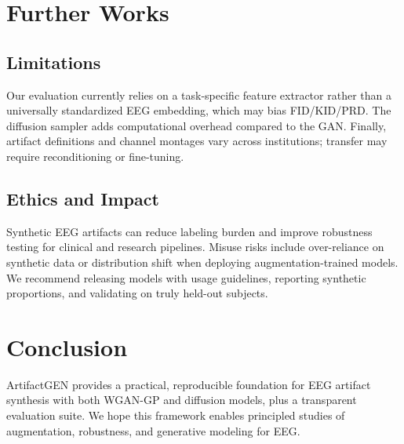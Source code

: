 \documentclass{article}
\begin{document}
\section{Further Works}

\subsection{Limitations}
Our evaluation currently relies on a task-specific feature extractor rather than a universally standardized EEG embedding, which may bias FID/KID/PRD. The diffusion sampler adds computational overhead compared to the GAN. Finally, artifact definitions and channel montages vary across institutions; transfer may require reconditioning or fine-tuning.

\subsection{Ethics and Impact}
Synthetic EEG artifacts can reduce labeling burden and improve robustness testing for clinical and research pipelines. Misuse risks include over-reliance on synthetic data or distribution shift when deploying augmentation-trained models. We recommend releasing models with usage guidelines, reporting synthetic proportions, and validating on truly held-out subjects.


\section{Conclusion}
ArtifactGEN provides a practical, reproducible foundation for EEG artifact synthesis with both WGAN-GP and diffusion models, plus a transparent evaluation suite. We hope this framework enables principled studies of augmentation, robustness, and generative modeling for EEG.




\small


\end{document}
